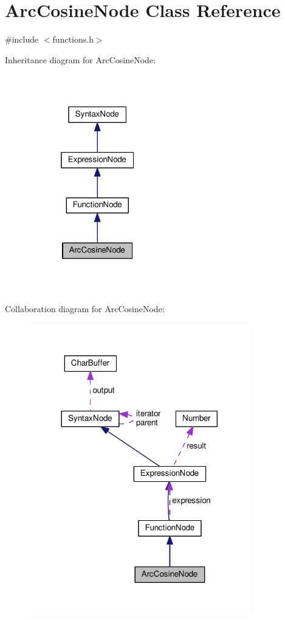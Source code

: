 \hypertarget{classArcCosineNode}{}\section{Arc\+Cosine\+Node Class Reference}
\label{classArcCosineNode}


{\ttfamily \#include $<$functions.\+h$>$}



Inheritance diagram for Arc\+Cosine\+Node\+:\nopagebreak
\begin{figure}[H]
\begin{center}
\leavevmode
\includegraphics[width=169pt]{classArcCosineNode__inherit__graph}
\end{center}
\end{figure}


Collaboration diagram for Arc\+Cosine\+Node\+:\nopagebreak
\begin{figure}[H]
\begin{center}
\leavevmode
\includegraphics[width=272pt]{classArcCosineNode__coll__graph}
\end{center}
\end{figure}
